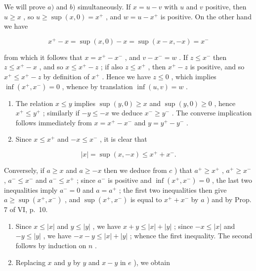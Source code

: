We will prove \(a)\) and \(b)\) simultaneously. If \(x = u - v\) with \(u\) and \(v\) positive, then \(u \geqslant x\) , so \(u \geqslant \sup (x, 0) = x^{+}\) , and \(w = u - x^{+}\) is positive. On the other hand we have

\[
x ^ {+} - x = \sup (x, 0) - x = \sup (x - x, - x) = x ^ {-}
\]

from which it follows that \(x = x^{+} - x^{-}\) , and \(v - x^{-} = w\) . If \(z \leqslant x^{-}\) then \(z \leqslant x^{+} - x\) , and so \(x \leqslant x^{+} - z\) ; if also \(z \leqslant x^{+}\) , then \(x^{+} - z\) is positive, and so \(x^{+} \leqslant x^{+} - z\) by definition of \(x^{+}\) . Hence we have \(z \leqslant 0\) , which implies \(\inf(x^{+}, x^{-}) = 0\) , whence by translation \(\inf(u, v) = w\) .

\begin{enumerate}
\def\labelenumi{\alph{enumi})}
\setcounter{enumi}{2}
\item
  The relation \(x \leqslant y\) implies \(\sup (y, 0) \geqslant x\) and \(\sup (y, 0) \geqslant 0\) , hence \(x^{+} \leqslant y^{+}\) ; similarly if \(-y \leqslant -x\) we deduce \(x^{-} \geqslant y^{-}\) . The converse implication follows immediately from \(x = x^{+} - x^{-}\) and \(y = y^{+} - y^{-}\) .
\item
  Since \(x \leqslant x^{+}\) and \(-x \leqslant x^{-}\) , it is clear that
\end{enumerate}

\[
\left| x \right| = \sup (x, - x) \leqslant x ^ {+} + x ^ {-}.
\]

Conversely, if \(a \geqslant x\) and \(a \geqslant -x\) then we deduce from \(c\) ) that \(a^+ \geqslant x^+\) , \(a^+ \geqslant x^-\) , \(a^- \leqslant x^-\) and \(a^- \leqslant x^+\) ; since \(a^-\) is positive and \(\inf(x^+, x^-) = 0\) , the last two inequalities imply \(a^- = 0\) and \(a = a^+\) ; the first two inequalities then give \(a \geqslant \sup(x^+, x^-)\) , and \(\sup(x^+, x^-)\) is equal to \(x^+ + x^-\) by \(a\) ) and by Prop. 7 of VI, p.~10.

\begin{enumerate}
\def\labelenumi{\alph{enumi})}
\setcounter{enumi}{4}
\item
  Since \(x \leqslant |x|\) and \(y \leqslant |y|\) , we have \(x + y \leqslant |x| + |y|\) ; since \(-x \leqslant |x|\) and \(-y \leqslant |y|\) , we have \(-x - y \leqslant |x| + |y|\) ; whence the first inequality. The second follows by induction on \(n\) .
\item
  Replacing \(x\) and \(y\) by \(y\) and \(x - y\) in \(e\) ), we obtain
\end{enumerate}

